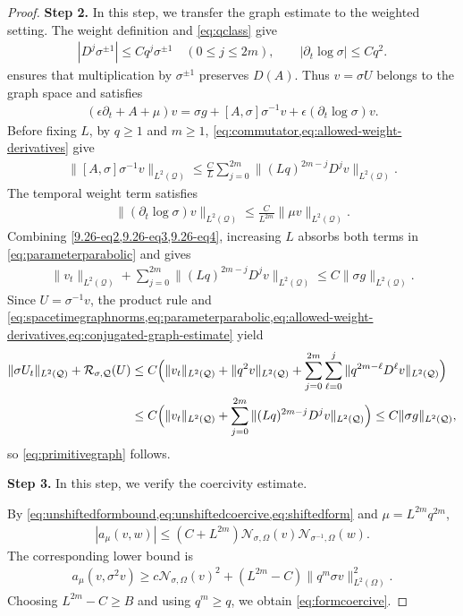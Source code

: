\documentclass[print,wide,eng]{draft}
\begin{document}
\begin{proof}
{\bf Step 2.}
In this step, we transfer the graph estimate to the weighted setting. The weight definition and \cref{eq:qclass} give
%
\begin{align}\label{eq:allowed-weight-derivatives}
|D^j\sigma^{\pm1}|\leq Cq^j\sigma^{\pm1}\quad(0\leq j\leq2m),
\qquad |\partial_t\log\sigma|\leq Cq^2.
\end{align}
%
 ensures that multiplication by $\sigma^{\pm1}$ preserves $D(A)$. Thus $v=\sigma U$ belongs to the graph space and satisfies
%
\begin{align}\label{9.26-eq2}
(\epsilon\partial_t+A+\mu)v
=\sigma g+[A,\sigma]\sigma^{-1}v
+\epsilon(\partial_t\log\sigma)v.
\end{align}
%
Before fixing $L$, by $q\geq1$ and $m\geq1$, \cref{eq:commutator,eq:allowed-weight-derivatives} give
%
\begin{align}\label{9.26-eq3}
\|[A,\sigma]\sigma^{-1}v\|_{L^2(\mathcal Q)}
\leq\frac{C}{L}\sum_{j=0}^{2m}\|(Lq)^{2m-j}D^jv\|_{L^2(\mathcal Q)}.
\end{align}
%
The temporal weight term satisfies
%
\begin{align}\label{9.26-eq4}
\|(\partial_t\log\sigma)v\|_{L^2(\mathcal Q)}
\leq\frac{C}{L^{2m}}\|\mu v\|_{L^2(\mathcal Q)}.
\end{align}
%
Combining \cref{9.26-eq2,9.26-eq3,9.26-eq4}, increasing $L$ absorbs both terms in \cref{eq:parameterparabolic} and gives
%
\begin{align}\label{eq:conjugated-graph-estimate}
\|v_t\|_{L^2(\mathcal Q)}
+\sum_{j=0}^{2m}\|(Lq)^{2m-j}D^jv\|_{L^2(\mathcal Q)}
\leq C\|\sigma g\|_{L^2(\mathcal Q)}.
\end{align}
%
Since $U=\sigma^{-1}v$, the product rule and \cref{eq:spacetimegraphnorms,eq:parameterparabolic,eq:allowed-weight-derivatives,eq:conjugated-graph-estimate} yield
%
\begin{align*}
\|\sigma U_t\|_{L^2(\mathcal Q)}+\mathcal R_{\sigma,\mathcal Q}(U)
&\leq C\Bigl(\|v_t\|_{L^2(\mathcal Q)}+\|q^2v\|_{L^2(\mathcal Q)}
+\sum_{j=0}^{2m}\sum_{\ell=0}^j\|q^{2m-\ell}D^\ell v\|_{L^2(\mathcal Q)}\Bigr)\\
&\leq C\Bigl(\|v_t\|_{L^2(\mathcal Q)}
+\sum_{j=0}^{2m}\|(Lq)^{2m-j}D^jv\|_{L^2(\mathcal Q)}\Bigr)
\leq C\|\sigma g\|_{L^2(\mathcal Q)},
\end{align*}
%
so \cref{eq:primitivegraph} follows.

\medskip

{\bf Step 3.}
In this step, we verify the coercivity estimate.

By \cref{eq:unshiftedformbound,eq:unshiftedcoercive,eq:shiftedform} and $\mu=L^{2m}q^{2m}$,
%
\begin{align*}
|a_\mu(v,w)|\leq(C+L^{2m})\mathcal N_{\sigma,\Omega}(v)\mathcal N_{\sigma^{-1},\Omega}(w).
\end{align*}
%
The corresponding lower bound is
%
\begin{align*}
a_\mu(v,\sigma^2v)
\geq c\mathcal N_{\sigma,\Omega}(v)^2+
(L^{2m}-C)\|q^m\sigma v\|_{L^2(\Omega)}^2.
\end{align*}
%
Choosing $L^{2m}-C\geq B$ and using $q^m\geq q$, we  obtain \cref{eq:formcoercive}.
\end{proof}
%
\end{document}
